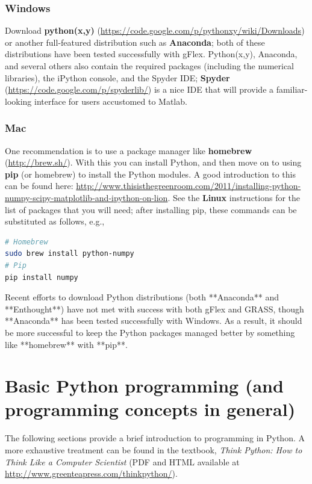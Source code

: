 \documentclass[a4paper,10pt]{scrartcl}
\begin{document}
\subsubsection{Windows}

Download \textbf{python(x,y)} (\url{https://code.google.com/p/pythonxy/wiki/Downloads}) or another full-featured distribution such as \textbf{Anaconda}; both of these distributions have been tested successfully with gFlex. Python(x,y), Anaconda, and several others also contain the required packages (including the numerical libraries), the iPython console, and the Spyder IDE; \textbf{Spyder} (\url{https://code.google.com/p/spyderlib/}) is a nice IDE that will provide a familiar-looking interface for users accustomed to Matlab.

\subsubsection{Mac}

One recommendation is to use a package manager like \textbf{homebrew} (\url{http://brew.sh/}). With this you can install Python, and then move on to using \textbf{pip} (or homebrew) to install the Python modules. A good introduction to this can be found here: \url{http://www.thisisthegreenroom.com/2011/installing-python-numpy-scipy-matplotlib-and-ipython-on-lion}. See the \textbf{Linux} instructions for the list of packages that you will need; after installing pip, these commands can be substituted as follows, e.g.,

\begin{lstlisting}[language=sh]
# Homebrew
sudo brew install python-numpy
# Pip
pip install numpy
\end{lstlisting}

Recent efforts to download Python distributions (both **Anaconda** and **Enthought**) have not met with success with both gFlex and GRASS, though **Anaconda** has been tested successfully with Windows. As a result, it should be more successful to keep the Python packages managed better by something like **homebrew** with **pip**.

\section{Basic Python programming (and programming concepts in general)}

The following sections provide a brief introduction to programming in Python. A more exhaustive treatment can be found in the textbook, \emph{Think Python: How to Think Like a Computer Scientist} (PDF and HTML available at \url{http://www.greenteapress.com/thinkpython/}).
\end{document}
